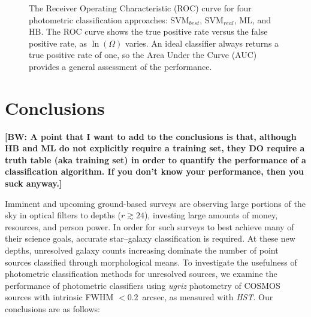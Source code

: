 \documentclass[12pt,preprint]{aastex}
\newcommand\bw[1]{{\bf [BW: #1]}}
\begin{document}
\begin{figure}
\centering
\caption{The Receiver Operating Characteristic (ROC) curve for four photometric 
classification approaches: SVM$_{best}$, SVM$_{real}$, ML, and HB.  The ROC curve 
shows the true positive rate versus the false positive rate, as $\ln(\Omega)$ varies.  An ideal classifier 
always returns a true positive rate of one, so the Area Under the Curve (AUC) provides a 
general assessment of the performance.}
\label{fig:roc}
\end{figure}



\section{Conclusions}

\bw{A point that I want to add to the conclusions is that, although HB and ML do not explicitly require a training set, they DO require a truth table (aka training set) in order to quantify the performance of a classification algorithm.  If you don't know your performance, then you suck anyway.}

Imminent and upcoming ground-based surveys are observing large
portions of the sky in optical filters to depths ($r\gtrsim24$),
investing large amounts of money, resources, and person power.  In
order for such surveys to best achieve many of their science goals,
accurate star--galaxy classification is required.  At these new
depths, unresolved galaxy counts increasing dominate the number of
point sources classified through morphological means.  To investigate
the usefulness of photometric classification methods for unresolved
sources, we examine the performance of photometric classifiers using
{\it ugriz} photometry of COSMOS sources with intrinsic FWHM $<0.2$~arcsec,
as measured with {\it HST}.  Our conclusions are as follows:
\end{document}
